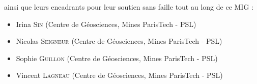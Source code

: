 \documentclass{article}
\begin{document}
ainsi que leurs encadrants pour leur soutien sans faille tout au long de ce MIG :
\begin{itemize}
    \item Irina \textsc{Sin} (Centre de Géosciences, Mines ParisTech - PSL)
    \item Nicolas \textsc{Seigneur} (Centre de Géosciences, Mines ParisTech - PSL)
    \item Sophie \textsc{Guillon} (Centre de Géosciences, Mines ParisTech - PSL)
    \item Vincent \textsc{Lagneau} (Centre de Géosciences, Mines ParisTech - PSL)
\end{itemize}

\end{document}
